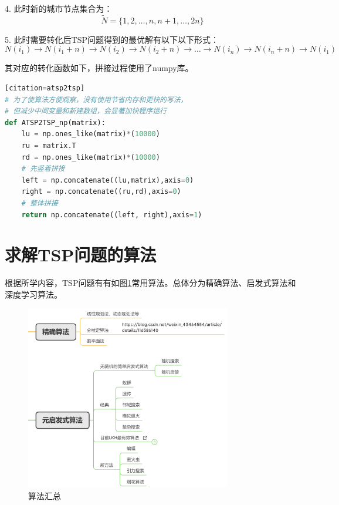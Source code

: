 \documentclass[lang=cn,11pt]{elegantpaper}
\begin{document}
4. 此时新的城市节点集合为：
\begin{equation}
\tilde{N}=
    \{1,2, \ldots, n, n+1, \ldots, 2 n\}
\label{eq:collection}
\end{equation}


5. 此时需要转化后TSP问题得到的最优解有以下以下形式：
\begin{equation}
N(i_1) \rightarrow N(i_1+n) \rightarrow N(i_2) \rightarrow N(i_2+n) \rightarrow \ldots \rightarrow N(i_n) \rightarrow N(i_n +n) \rightarrow N(i_1) 
\label{eq:transpose}
\end{equation}


其对应的转化函数如下，拼接过程使用了numpy库。
\begin{lstlisting}[language=python][citation=atsp2tsp]
# 为了使算法方便观察，没有使用节省内存和更快的写法，
# 但减少中间变量和新建数组，会显著加快程序运行
def ATSP2TSP_np(matrix):
    lu = np.ones_like(matrix)*(10000)
    ru = matrix.T
    rd = np.ones_like(matrix)*(10000)
    # 先竖着拼接
    left = np.concatenate((lu,matrix),axis=0)
    right = np.concatenate((ru,rd),axis=0)
    # 整体拼接
    return np.concatenate((left, right),axis=1)
\end{lstlisting}





\section{求解TSP问题的算法}
根据所学内容，TSP问题有有如图\ref{img:算法汇总}常用算法。总体分为精确算法、启发式算法和深度学习算法。

\begin{figure}[h]
  \centering
  \includegraphics[width=0.8\textwidth]{figure/算法汇总.png} %
  \caption{算法汇总 } %
   \label{img:算法汇总}
\end{figure}
\end{document}
